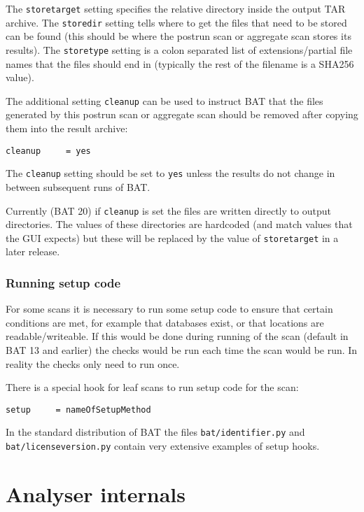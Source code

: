 \documentclass[10pt]{article}
\begin{document}
The \texttt{storetarget} setting specifies the relative directory inside the
output TAR archive. The \texttt{storedir} setting tells where to get the files
that need to be stored can be found (this should be where the postrun scan
or aggregate scan stores its results). The \texttt{storetype} setting is a colon
separated list of extensions/partial file names that the files should end in
(typically the rest of the filename is a SHA256 value).

The additional setting \texttt{cleanup} can be used to instruct BAT that the
files generated by this postrun scan or aggregate scan should be removed after
copying them into the result archive:

\begin{verbatim}
cleanup     = yes
\end{verbatim}

The \texttt{cleanup} setting should be set to \texttt{yes} unless the results
do not change in between subsequent runs of BAT.

Currently (BAT 20) if \texttt{cleanup} is set the files are written directly to
output directories. The values of these directories are hardcoded (and match
values that the GUI expects) but these will be replaced by the value of
\texttt{storetarget} in a later release.

\subsubsection{Running setup code}

For some scans it is necessary to run some setup code to ensure that certain
conditions are met, for example that databases exist, or that locations are
readable/writeable. If this would be done during running of the scan (default
in BAT 13 and earlier) the checks would be run each time the scan would be run.
In reality the checks only need to run once.

There is a special hook for leaf scans to run setup code for the scan:

\begin{verbatim}
setup     = nameOfSetupMethod
\end{verbatim}

In the standard distribution of BAT the files \texttt{bat/identifier.py} and
\texttt{bat/licenseversion.py} contain very extensive examples of setup hooks.

\section{Analyser internals}
\end{document}
